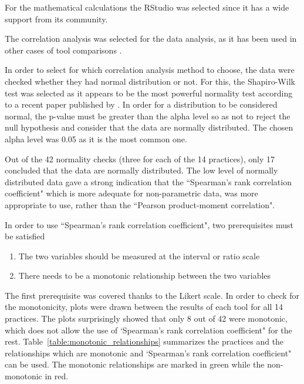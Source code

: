 For the mathematical calculations the RStudio\texttrademark \cite{rstudio} was selected since it has a wide support from its community. 

The correlation analysis was selected for the data analysis, as it has been used in other cases of tool comparisons \cite{jalali_angelis,  Delestras2013}. 

In order to select for which correlation analysis method to choose, the data were checked whether they had normal distribution or not. For this, the Shapiro-Wilk test was selected as it appears to be the most powerful normality test according to a recent paper published by \citet{Razali}. In order for a distribution to be considered normal, the p-value must be greater than the alpha level so as not to reject the null hypothesis and consider that the data are normally distributed. The chosen alpha level was 0.05 as it is the most common one.

Out of the 42 normality checks (three for each of the 14 practices), only 17 concluded that the data are normally distributed. The low level of normally distributed data gave a strong indication that the ``Spearman’s rank correlation coefficient" which is more adequate for non-parametric data, was more appropriate to use, rather than the ``Pearson product-moment correlation".

In order to use ``Spearman’s rank correlation coefficient", two prerequisites must be satisfied
\begin{enumerate}
\item The two variables should be measured at the interval or ratio scale
\item There needs to be a monotonic relationship between the two variables
\end{enumerate}

The first prerequisite was covered thanks to the Likert scale. In order to check for the monotonicity, plots were drawn between the results of each tool for all 14 practices. The plots surprisingly showed that only 8 out of 42 were monotonic, which does not allow the use of `Spearman’s rank correlation coefficient" for the rest. Table~\ref{table:monotonic_relationships} summarizes the practices and the relationships which are monotonic and `Spearman’s rank correlation coefficient" can be used. The monotonic relationships are marked in green while the non-monotonic in red.

\newenvironment{mntnc_itemize} 
{ 
	\begin{itemize}
    \setlength{\itemsep}{0pt}  
    \setlength{\parskip}{0pt}  
}
{ \end{itemize}  }

